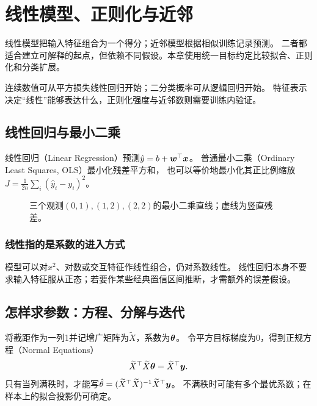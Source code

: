 \chapter{线性模型、正则化与近邻}
\label{ch:linear}

线性模型把输入特征组合为一个得分；近邻模型根据相似训练记录预测。
二者都适合建立可解释的起点，但依赖不同假设。本章使用统一目标约定比较拟合、正则化和分类扩展。

\begin{keyidea}[把模型与训练目标配对]
连续数值可从平方损失线性回归开始；二分类概率可从逻辑回归开始。
特征表示决定“线性”能够表达什么，正则化强度与近邻数则需要训练内验证。
\end{keyidea}

\section{线性回归与最小二乘}
\label{sec:linear-ols}
线性回归（Linear Regression）预测$\hat y=b+\boldsymbol{w}^\top\boldsymbol{x}$。
普通最小二乘（Ordinary Least Squares, OLS）最小化残差平方和，
也可以等价地最小化其正比例缩放$J=\frac1{2n}\sum_i(\hat y_i-y_i)^2$。

\begin{figure}[htbp]
\centering
\caption{三个观测$(0,1),(1,2),(2,2)$的最小二乘直线；虚线为竖直残差。}
\par\smallskip
{}
\end{figure}

\subsection{线性指的是系数的进入方式}
模型可以对$x^2$、对数或交互特征作线性组合，仍对系数线性。
线性回归本身不要求输入特征服从正态；若要作某些经典置信区间推断，才需额外的误差假设。


\section{怎样求参数：方程、分解与迭代}
\label{sec:linear-solve}
将截距作为一列1并记增广矩阵为$\widetilde X$，系数为$\boldsymbol{\theta}$。
令平方目标梯度为0，得到正规方程（Normal Equations）
\[
 \widetilde X^\top\widetilde X\boldsymbol{\theta}=\widetilde X^\top\boldsymbol{y}.
\]
只有当列满秩时，才能写$\hat\theta=(\widetilde X^\top\widetilde X)^{-1}\widetilde X^\top\boldsymbol{y}$。
不满秩时可能有多个最优系数；在样本上的拟合投影仍可确定。

